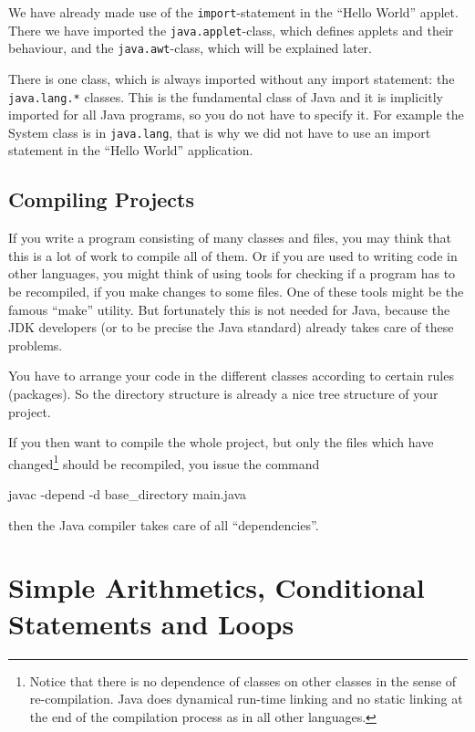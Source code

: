 We have already made use of the \verb|import|-statement in the ``Hello World'' 
applet. There we have imported the \verb|java.applet|-class, which
defines applets and their behaviour, and the \verb|java.awt|-class, which
will be explained later.
 
There is one class, which is always imported without any import statement:
the \verb|java.lang.*| classes. This is the fundamental class of Java and it is
implicitly imported for all Java programs, so you do not have to specify
it. For example the System class is in \verb|java.lang|, that is why
we did not have to use an import statement in the ``Hello World''
application.  

\subsection{Compiling Projects}
If you write a program consisting of many classes and files, you
may think that this is a lot of work to compile all of them. Or if
you are used to writing code in other languages, you might think
of using tools for checking if a program has to be recompiled, if you make
changes to some files. One of these tools might be the famous ``make''
utility. But fortunately this is not needed for Java, because
the JDK developers (or to be precise the Java standard) already
takes care of these problems. 

You have to arrange your code in the different classes according to 
certain rules (packages). So the directory structure is already a
nice tree structure of your project. 

If you then want to compile
the whole project, but only the files which have changed\footnote{Notice
that there is no dependence of classes on other classes in the
sense of re-compilation. Java does dynamical run-time linking and no static 
linking at the end of the compilation process as in all other languages.}
should be recompiled, you issue the
command 
\begin{sverbatim}
javac -depend -d base_directory main.java
\end{sverbatim}
then the Java compiler takes care of all ``dependencies''.   

\section{Simple Arithmetics, Conditional Statements and Loops}
\label{sec:Loops}

